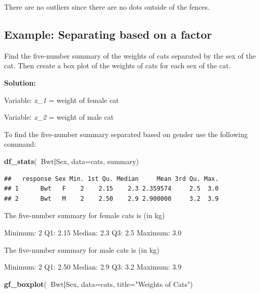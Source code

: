 \documentclass[
]{book}
\newenvironment{Shaded}{\begin{snugshade}}{\end{snugshade}}
\newcommand{\DataTypeTok}[1]{\textcolor[rgb]{0.13,0.29,0.53}{#1}}
\newcommand{\KeywordTok}[1]{\textcolor[rgb]{0.13,0.29,0.53}{\textbf{#1}}}
\newcommand{\NormalTok}[1]{#1}
\newcommand{\OperatorTok}[1]{\textcolor[rgb]{0.81,0.36,0.00}{\textbf{#1}}}
\newcommand{\StringTok}[1]{\textcolor[rgb]{0.31,0.60,0.02}{#1}}
\begin{document}
There are no outliers since there are no dots outside of the fences.

\hypertarget{example-separating-based-on-a-factor}{%
\subsection{Example: Separating based on a factor}\label{example-separating-based-on-a-factor}}

Find the five-number summary of the weights of cats separated by the sex of the cat. Then create a box plot of the weights of cats for each sex of the cat.

\textbf{Solution:}

Variable: \emph{x\_1} = weight of female cat

Variable: \emph{x\_2} = weight of male cat

To find the five-number summary separated based on gender use the following command:

\begin{Shaded}
\begin{Highlighting}[]
\KeywordTok{df_stats}\NormalTok{(}\OperatorTok{~}\NormalTok{Bwt}\OperatorTok{|}\NormalTok{Sex, }\DataTypeTok{data=}\NormalTok{cats, summary)}
\end{Highlighting}
\end{Shaded}

\begin{verbatim}
##   response Sex Min. 1st Qu. Median     Mean 3rd Qu. Max.
## 1      Bwt   F    2    2.15    2.3 2.359574     2.5  3.0
## 2      Bwt   M    2    2.50    2.9 2.900000     3.2  3.9
\end{verbatim}

The five-number summary for female cats is (in kg)

Minimum: 2
Q1: 2.15
Median: 2.3
Q3: 2.5
Maximum: 3.0

The five-number summary for male cats is (in kg)

Minimum: 2
Q1: 2.50
Median: 2.9
Q3: 3.2
Maximum: 3.9



\begin{Shaded}
\begin{Highlighting}[]
\KeywordTok{gf_boxplot}\NormalTok{(}\OperatorTok{~}\NormalTok{Bwt}\OperatorTok{|}\NormalTok{Sex, }\DataTypeTok{data=}\NormalTok{cats, }\DataTypeTok{title=}\StringTok{"Weights of Cats"}\NormalTok{)}
\end{Highlighting}
\end{Shaded}
\end{document}
